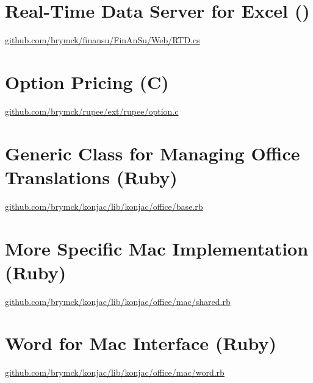 \section{Real-Time Data Server for Excel (\CS{})}
\href{https://github.com/brymck/finansu/FinAnSu/Web/RTD.cs}{github.com/brymck/finansu/FinAnSu/Web/RTD.cs}

\pagebreak
\section{Option Pricing (C)}
\href{https://github.com/brymck/rupee/ext/rupee/option.c}{github.com/brymck/rupee/ext/rupee/option.c}

\pagebreak
\section{Generic Class for Managing Office Translations (Ruby)}
\href{https://github.com/brymck/konjac/lib/konjac/office/base.rb}{github.com/brymck/konjac/lib/konjac/office/base.rb}

\pagebreak
\section{More Specific Mac Implementation (Ruby)}
\href{https://github.com/brymck/konjac/lib/konjac/office/mac/shared.rb}{github.com/brymck/konjac/lib/konjac/office/mac/shared.rb}

\pagebreak
\section{Word for Mac Interface (Ruby)}
\href{https://github.com/brymck/konjac/lib/konjac/office/mac/word.rb}{github.com/brymck/konjac/lib/konjac/office/mac/word.rb}

\pagebreak
